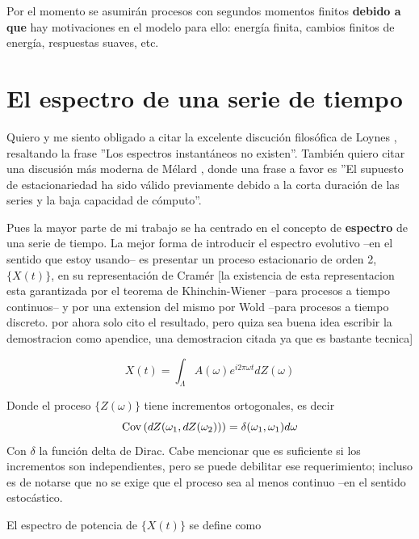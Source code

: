 Por el momento se asumir\'an procesos con segundos momentos finitos 
\textbf{debido a que} hay motivaciones
en el modelo para ello: energ\'ia finita, cambios finitos de energ\'ia, respuestas suaves, etc.


\section{El espectro de una serie de tiempo}

Quiero y me siento obligado a citar la excelente discuci\'on
filos\'ofica
de Loynes \cite{Loynes68}, resaltando la frase ''Los espectros instant\'aneos no existen''.
Tambi\'en quiero citar una discusi\'on m\'as moderna de M\'elard \cite{Melard89}, donde una
frase a favor es ''El supuesto de estacionariedad ha sido v\'alido previamente debido a la corta
duraci\'on de las series y la baja capacidad de c\'omputo''.

Pues la mayor parte de mi trabajo se ha centrado en el concepto de \textbf{espectro} de una serie
de tiempo. La mejor forma de introducir el espectro evolutivo 
--en el sentido que estoy usando-- es
presentar un proceso estacionario de orden 2,
 $\{X(t)\}$, en su representaci\'on de Cram\'er \cite{Priestley81}
[la existencia de esta representacion esta garantizada por el teorema de Khinchin-Wiener --para
procesos a tiempo continuos-- y por una extension del mismo por Wold --para procesos a tiempo
discreto.
por ahora solo cito el resultado, pero quiza sea buena idea escribir la demostracion
como apendice, una demostracion citada ya que es bastante tecnica]

\begin{equation*}
X(t) = \int_{\Lambda} A(\omega) e^{i 2\pi \omega t} dZ(\omega)
\end{equation*}

Donde el proceso $\{ Z(\omega) \}$ tiene incrementos ortogonales, es decir 
\begin{equation*}
\mathrm{Cov}\left( dZ(\omega_1,dZ(\omega_2)) \right) = \delta(\omega_1,\omega_1) d\omega
\end{equation*}
Con $\delta$ la funci\'on delta de Dirac. Cabe mencionar que es suficiente si los incrementos
son independientes, pero se puede debilitar ese requerimiento; incluso es de notarse que no
se exige que el proceso sea al menos continuo --en el sentido estoc\'astico.

El espectro de potencia de $\{X(t)\}$ se define como

